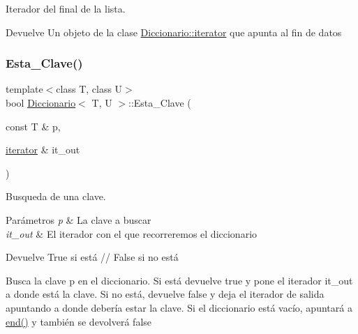 Iterador del final de la lista. 

\begin{DoxyReturn}{Devuelve}
Un objeto de la clase \hyperlink{classDiccionario_1_1iterator}{Diccionario\+::iterator} que apunta al fin de datos 
\end{DoxyReturn}
\mbox{\label{classDiccionario_a16314351b0600835ade3c7add2ffe040}} 
\subsubsection{\texorpdfstring{Esta\+\_\+\+Clave()}{Esta\_Clave()}}
{\footnotesize\ttfamily template$<$class T, class U$>$ \\
bool \hyperlink{classDiccionario}{Diccionario}$<$ T, U $>$\+::Esta\+\_\+\+Clave (\begin{DoxyParamCaption}\item[{const T \&}]{p,  }\item[{\hyperlink{classDiccionario_1_1iterator}{iterator} \&}]{it\+\_\+out }\end{DoxyParamCaption})\hspace{0.3cm}{\ttfamily [inline]}}



Busqueda de una clave. 


\begin{DoxyParams}{Parámetros}
{\em p} & La clave a buscar \\
\hline
{\em it\+\_\+out} & El iterador con el que recorreremos el diccionario\\
\hline
\end{DoxyParams}
\begin{DoxyReturn}{Devuelve}
True si está // False si no está
\end{DoxyReturn}
Busca la clave p en el diccionario. Si está devuelve true y pone el iterador it\+\_\+out a donde está la clave. Si no está, devuelve false y deja el iterador de salida apuntando a donde debería estar la clave. Si el diccionario está vacío, apuntará a \hyperlink{classDiccionario_adb5cdbfce59b4005bd07473273df3a8e}{end()} y también se devolverá false \mbox{\label{classDiccionario_ad262cd8d8e11286beecfa4851ec2c948}} 
